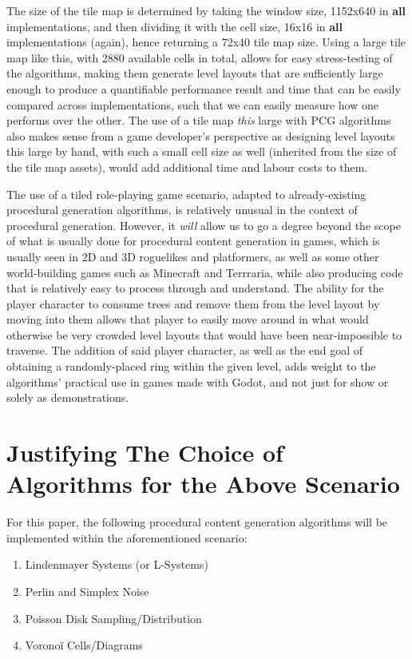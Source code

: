The size of the tile map is determined by taking the window size, 1152x640 in \textbf{all} implementations, and then dividing it with the cell size, 16x16 in \textbf{all} implementations (again), hence returning a 72x40 tile map size. Using a large tile map like this, with 2880 available cells in total, allows for easy stress-testing of the algorithms, making them generate level layouts that are sufficiently large enough to produce a quantifiable performance result and time that can be easily compared across implementations, such that we can easily measure how one performs over the other. The use of a tile map \textit{this} large with PCG algorithms also makes sense from a game developer's perspective as designing level layouts this large by hand, with such a small cell size as well (inherited from the size of the tile map assets), would add additional time and labour costs to them. 

The use of a tiled role-playing game scenario, adapted to already-existing procedural generation algorithms, is relatively unusual in the context of procedural generation. However, it \textit{will} allow us to go a degree beyond the scope of what is usually done for procedural content generation in games, which is usually seen in 2D and 3D roguelikes and platformers, as well as some other world-building games such as Minecraft and Terrraria, while also producing code that is relatively easy to process through and understand. The ability for the player character to consume trees and remove them from the level layout by moving into them allows that player to easily move around in what would otherwise be very crowded level layouts that would have been near-impossible to traverse. The addition of said player character, as well as the end goal of obtaining a randomly-placed ring within the given level, adds weight to the algorithms' practical use in games made with Godot, and not just for show or solely as demonstrations. 

\section{Justifying The Choice of Algorithms for the Above Scenario}

For this paper, the following procedural content generation algorithms will be implemented within the aforementioned scenario:

\begin{enumerate}
    \item Lindenmayer Systems (or L-Systems)
    \item Perlin and Simplex Noise
    \item Poisson Disk Sampling/Distribution
    \item Voronoï Cells/Diagrams
\end{enumerate}

